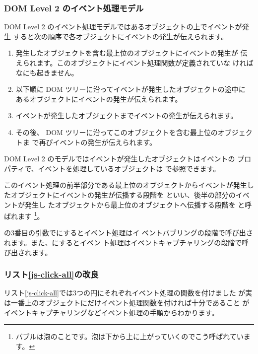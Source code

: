 \subsubsection{DOM Level 2 のイベント処理モデル}
DOM Level 2 のイベント処理モデルではあるオブジェクトの上でイベントが発生
すると次の順序で各オブジェクトにイベントの発生が伝えられます。
\begin{enumerate}
 \item 発生したオブジェクトを含む最上位のオブジェクトにイベントの発生が
       伝えられます。このオブジェクトにイベント処理関数が定義されていな
       ければなにも起きません。
 \item 以下順に DOM ツリーに沿ってイベントが発生したオブジェクトの途中に
       あるオブジェクトにイベントの発生が伝えられます。
 \item イベントが発生したオブジェクトまでイベントの発生が伝えられます。
 \item その後、
       DOM ツリーに沿ってこのオブジェクトを含む最上位のオブジェクトま
       で再びイベントの発生が伝えられます。
\end{enumerate}
DOM Level 2 のモデルではイベントが発生したオブジェクトはイベントの
プロパティで、イベントを処理しているオブジェクトは
で参照できます。

このイベント処理の前半部分である最上位のオブジェクトからイベントが発生し
たオブジェクトにイベントの発生が伝播する段階を
といい、後半の部分のイベントが発生し
たオブジェクトから最上位のオブジェクトへ伝播する段階を
と呼ばれます
\footnote{バブルは泡のことです。泡は下から上に上がっていくのでこう呼ばれています。}。

の3番目の引数でにするとイベント処理はイ
ベントバブリングの段階で呼び出されます。また、にするとイベン
ト処理はイベントキャプチャリングの段階で呼び出されます。

\subsubsection{リスト\ref{js-click-all}の改良}
リスト\ref{js-click-all}では3つの円にそれぞれイベント処理の関数を付けました
が実は一番上のオブジェクトにだけイベント処理関数を付ければ十分であること
がイベントキャプチャリングなどイベント処理の手順からわかります。


